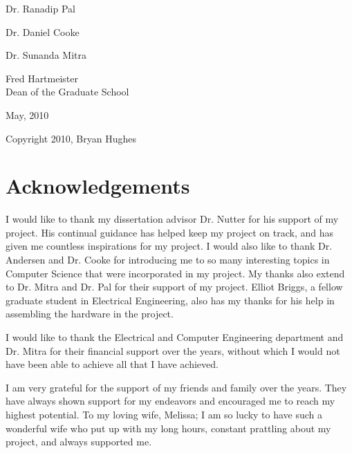 \begin{titlepage}
\begin{centering}
Dr. Ranadip Pal\\

\vspace{8pt}

Dr. Daniel Cooke\\

\vspace{8pt}

Dr. Sunanda Mitra\\

\vspace{18pt}

Fred Hartmeister\\
Dean of the Graduate School\\

\vspace{18pt}

May, 2010\\

\end{centering}
\end{titlepage}

\vspace*{\fill}
\begingroup
\centering
\thispagestyle{empty}

Copyright 2010, Bryan Hughes

\endgroup
\vspace*{\fill}

\chapter{Acknowledgements}
I would like to thank my dissertation advisor Dr. Nutter for his support of my project. His continual guidance has helped keep my project on track, and has given me countless inspirations for my project. I would also like to thank Dr. Andersen and Dr. Cooke for introducing me to so many interesting topics in Computer Science that were incorporated in my project. My thanks also extend to Dr. Mitra and Dr. Pal for their support of my project. Elliot Briggs, a fellow graduate student in Electrical Engineering, also has my thanks for his help in assembling the hardware in the project.

I would like to thank the Electrical and Computer Engineering department and Dr. Mitra for their financial support over the years, without which I would not have been able to achieve all that I have achieved. 

I am very grateful for the support of my friends and family over the years. They have always shown support for my endeavors and encouraged me to reach my highest potential. To my loving wife, Melissa; I am so lucky to have such a wonderful wife who put up with my long hours, constant prattling about my project, and always supported me.


